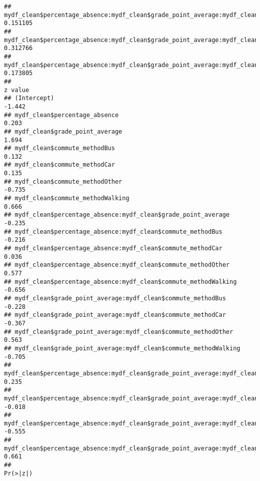\documentclass[
]{article}
\begin{document}
\begin{verbatim}
## mydf_clean$percentage_absence:mydf_clean$grade_point_average:mydf_clean$commute_methodCar       0.151105
## mydf_clean$percentage_absence:mydf_clean$grade_point_average:mydf_clean$commute_methodOther     0.312766
## mydf_clean$percentage_absence:mydf_clean$grade_point_average:mydf_clean$commute_methodWalking   0.173805
##                                                                                               z value
## (Intercept)                                                                                    -1.442
## mydf_clean$percentage_absence                                                                   0.203
## mydf_clean$grade_point_average                                                                  1.694
## mydf_clean$commute_methodBus                                                                    0.132
## mydf_clean$commute_methodCar                                                                    0.135
## mydf_clean$commute_methodOther                                                                 -0.735
## mydf_clean$commute_methodWalking                                                                0.666
## mydf_clean$percentage_absence:mydf_clean$grade_point_average                                   -0.235
## mydf_clean$percentage_absence:mydf_clean$commute_methodBus                                     -0.216
## mydf_clean$percentage_absence:mydf_clean$commute_methodCar                                      0.036
## mydf_clean$percentage_absence:mydf_clean$commute_methodOther                                    0.577
## mydf_clean$percentage_absence:mydf_clean$commute_methodWalking                                 -0.656
## mydf_clean$grade_point_average:mydf_clean$commute_methodBus                                    -0.228
## mydf_clean$grade_point_average:mydf_clean$commute_methodCar                                    -0.367
## mydf_clean$grade_point_average:mydf_clean$commute_methodOther                                   0.563
## mydf_clean$grade_point_average:mydf_clean$commute_methodWalking                                -0.705
## mydf_clean$percentage_absence:mydf_clean$grade_point_average:mydf_clean$commute_methodBus       0.235
## mydf_clean$percentage_absence:mydf_clean$grade_point_average:mydf_clean$commute_methodCar      -0.018
## mydf_clean$percentage_absence:mydf_clean$grade_point_average:mydf_clean$commute_methodOther    -0.555
## mydf_clean$percentage_absence:mydf_clean$grade_point_average:mydf_clean$commute_methodWalking   0.661
##                                                                                               Pr(>|z|)

\end{verbatim}
\end{document}
